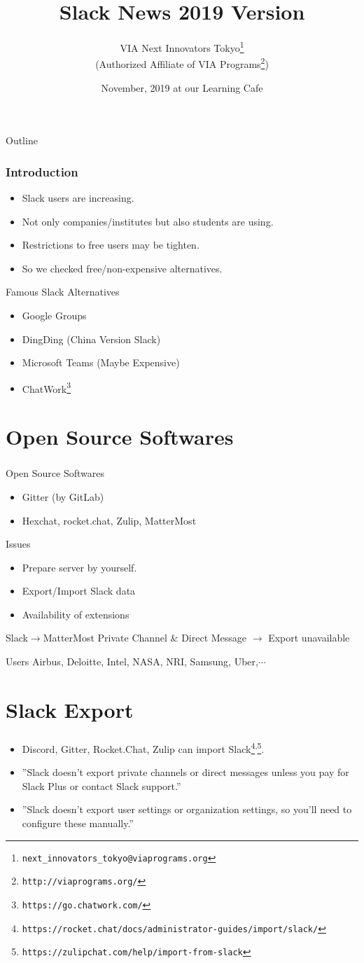\documentclass[dvipdfmx,10pt]{beamer}
\title{Slack News 2019 Version}
\author[VIA Next Innovators Tokyo]{VIA Next Innovators Tokyo\footnote{\texttt{next\_innovators\_tokyo@viaprograms.org}}\\(Authorized Affiliate of VIA Programs\footnote{\texttt{http://viaprograms.org/}})}
\date[November, 2019]{November, 2019 at our Learning Cafe}
\newcommand{\bb}{\begin{block}}
\newcommand{\eb}{\end{block}}
\newcommand{\bit}{\begin{itemize}}
\newcommand{\eit}{\end{itemize}}
\newcommand{\ft}{\frametitle}
\begin{document}
\begin{frame}
\titlepage
\end{frame}
\begin{frame}{Outline}
  \setcounter{tocdepth}{3}  
  \tableofcontents[
    sectionstyle=show,
    subsectionstyle=show/show,
    subsubsectionstyle=show/show/show
    ]
\end{frame}
\begin{frame}\ft{Introduction}
\footnotesize
\bit
\item Slack users are increasing.
\item Not only companies/institutes but also students are using.
\item Restrictions to free users may be tighten.
\item So we checked free/non-expensive alternatives.
\eit
\bb{Famous Slack Alternatives}
\bit
\item Google Groups
\item DingDing (China Version Slack)
\item Microsoft Teams (Maybe Expensive)
\item ChatWork\footnote{\texttt{https://go.chatwork.com/}}
\eit
\eb
\normalsize
\end{frame}
\section{Open Source Softwares}
\begin{frame}\ft{\insertsection}
\footnotesize
\bb{Open Source Softwares}
\bit
\item Gitter (by GitLab)
\item Hexchat, rocket.chat, Zulip, MatterMost
\eit
\eb
\bb{Issues}
\bit
\item Prepare server by yourself.
\item Export/Import Slack data
\item Availability of extensions
\eit
\eb
\bb{Slack$\to$MatterMost}
Private Channel \& Direct Message $\to$ Export unavailable
\eb
\bb{Users}
Airbus, Deloitte, Intel, NASA, NRI, Samsung, Uber,$\cdots$ 
\eb
\normalsize
\end{frame}
\section{Slack Export}
\begin{frame}\ft{\insertsection}
\bit
\item Discord, Gitter, Rocket.Chat, Zulip can import Slack\footnote{\texttt{https://rocket.chat/docs/administrator-guides/import/slack/}}\textsuperscript{,}\footnote{\texttt{https://zulipchat.com/help/import-from-slack}}.
\item ''Slack doesn't export private channels or direct messages unless you pay for Slack Plus or contact Slack support.''
\item ''Slack doesn't export user settings or organization settings, so you'll need to configure these manually.''
\eit
\end{frame}
\end{document}
